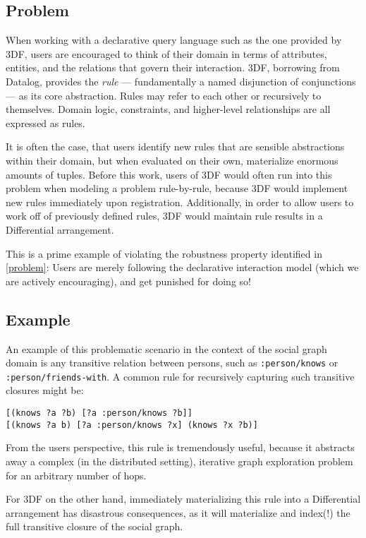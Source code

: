 \documentclass[../catalog.tex]{subfiles}
\begin{document}
\subsection{Problem}

When working with a declarative query language such as the one
provided by 3DF, users are encouraged to think of their domain in
terms of attributes, entities, and the relations that govern their
interaction. 3DF, borrowing from Datalog, provides the \emph{rule} —
fundamentally a named disjunction of conjunctions — as its core
abstraction. Rules may refer to each other or recursively to
themselves. Domain logic, constraints, and higher-level relationships
are all expressed as rules.

It is often the case, that users identify new rules that are sensible
abstractions within their domain, but when evaluated on their own,
materialize enormous amounts of tuples. Before this work, users of 3DF
would often run into this problem when modeling a problem
rule-by-rule, because 3DF would implement new rules immediately upon
registration. Additionally, in order to allow users to work off of
previously defined rules, 3DF would maintain rule results in a
Differential arrangement.

This is a prime example of violating the robustness property
identified in \ref{problem}: Users are merely following the
declarative interaction model (which we are actively encouraging), and
get punished for doing so!

\subsection{Example}

An example of this problematic scenario in the context of the social
graph domain is any transitive relation between persons, such as
\texttt{:person/knows} or \texttt{:person/friends-with}. A common rule
for recursively capturing such transitive closures might be:

\begin{verbatim}
[(knows ?a ?b) [?a :person/knows ?b]]
[(knows ?a b) [?a :person/knows ?x] (knows ?x ?b)]
\end{verbatim}

From the users perspective, this rule is tremendously useful, because
it abstracts away a complex (in the distributed setting), iterative
graph exploration problem for an arbitrary number of hops.

For 3DF on the other hand, immediately materializing this rule into a
Differential arrangement has disastrous consequences, as it will
materialize and index(!) the full transitive closure of the social
graph.
\end{document}
